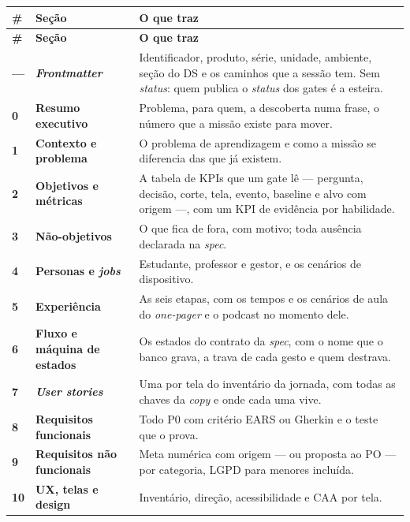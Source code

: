 \documentclass[11pt,a4paper]{article}
\begin{document}
\begin{center}
\begin{longtable}{>{\centering\arraybackslash\sffamily\bfseries\footnotesize\color{unLavanda}}p{0.7cm}>{\sffamily\bfseries\footnotesize\color{unNavy}}p{4.5cm}p{9.0cm}}
\toprule
\sffamily\bfseries\footnotesize\color{unNavy}\# & \sffamily\bfseries\footnotesize\color{unNavy}Seção & \sffamily\bfseries\footnotesize\color{unNavy}O que traz \\
\midrule
\endfirsthead
\toprule
\sffamily\bfseries\footnotesize\color{unNavy}\# & \sffamily\bfseries\footnotesize\color{unNavy}Seção & \sffamily\bfseries\footnotesize\color{unNavy}O que traz \\
\midrule
\endhead
--- & \emph{Frontmatter} & Identificador, produto, série, unidade, ambiente, seção do DS e os caminhos que a sessão tem. Sem \emph{status}: quem publica o \emph{status} dos gates é a esteira. \\
0 & Resumo executivo & Problema, para quem, a descoberta numa frase, o número que a missão existe para mover. \\
1 & Contexto e problema & O problema de aprendizagem e como a missão se diferencia das que já existem. \\
2 & Objetivos e métricas & A tabela de KPIs que um gate lê --- pergunta, decisão, corte, tela, evento, baseline e alvo com origem ---, com um KPI de evidência por habilidade. \\
3 & Não-objetivos & O que fica de fora, com motivo; toda ausência declarada na \emph{spec}. \\
4 & Personas e \emph{jobs} & Estudante, professor e gestor, e os cenários de dispositivo. \\
5 & Experiência & As seis etapas, com os tempos e os cenários de aula do \emph{one-pager} e o podcast no momento dele. \\
6 & Fluxo e máquina de estados & Os estados do contrato da \emph{spec}, com o nome que o banco grava, a trava de cada gesto e quem destrava. \\
7 & \emph{User stories} & Uma por tela do inventário da jornada, com todas as chaves da \emph{copy} e onde cada uma vive. \\
8 & Requisitos funcionais & Todo P0 com critério EARS ou Gherkin e o teste que o prova. \\
9 & Requisitos não funcionais & Meta numérica com origem --- ou proposta ao PO --- por categoria, LGPD para menores incluída. \\
10 & UX, telas e design & Inventário, direção, acessibilidade e CAA por tela. \\

\end{longtable}
\end{center}
\end{document}
